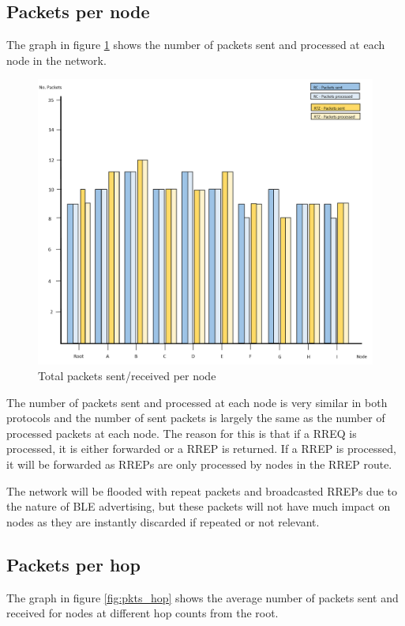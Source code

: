     \subsection{Packets per node}
    The graph in figure \ref{fig:pkts_node} shows the number of packets sent
    and processed at each node in the network.

    \FloatBarrier
    \begin{figure}[ht]
      \includegraphics[width=\textwidth]{Images/chapter5/pkts_node.png}
      \caption{Total packets sent/received per node}
      \label{fig:pkts_node}
    \end{figure}
    \FloatBarrier

    The number of packets sent and processed at each node is very similar in both
    protocols and the number of sent packets is largely the same as the number of
    processed packets at each node.
    The reason for this is that if a RREQ is processed, it is either forwarded or a
    RREP is returned. If a RREP is processed, it will be forwarded as RREPs are
    only processed by nodes in the RREP route.

    The network will be flooded with
    repeat packets and broadcasted RREPs due to the nature of BLE advertising, but these packets will not
    have much impact on nodes as they are instantly discarded if repeated or not
    relevant.

    \subsection{Packets per hop}
    The graph in figure \ref{fig:pkts_hop} shows the average number of packets sent
    and received for nodes at different hop counts from the root.

